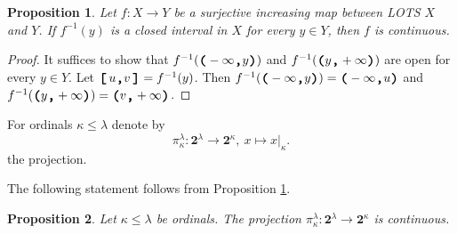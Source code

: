 \documentclass[preprint]{elsarticle}
\def\la{\lambda}
\def\ka{\kappa}
\newcommand\restrB[2]{\ensuremath{\left.#1\right|_{#2}}}
\def\restr#1#2{\restrB{#1}{#2}}
\newtheorem{proposition}{Proposition}[section]
\theoremstyle{definition}
\theoremstyle{remark}
\def\lex#1#2{\mathfrak{L}(#2^{#1})}
\def\lex#1#2{#2^{#1}}
\def\lL(#1,#2){(-\infty,#1)}
\def\lR(#1,#2){(#1,+\infty)}
\def\B{2}
\def\B{\mathsf{2}}
\def\B{\mathbf{2}}
\def\ilcomma/{\boldsymbol{,}}
\def\ilsymlp{\boldsymbol{(}}
\def\ilsymrp{\boldsymbol{)}}
\def\ilsymlc{\boldsymbol{[}}
\def\ilsymrc{\boldsymbol{]}}
\def\ilfont#1{\boldsymbol{#1}}
\def\ilfontX#1{\mathrm{\text{\texttt{\textbf{\large #1}}}}}
\def\ilfontX#1{{\text{\texttt{\textbf{\large \upshape #1}}}}}
\def\ilfont#1{\raisebox{-1.2pt}{\ilfontX{#1}}}
\def\ilfontC#1{\raisebox{-0.7pt}{\ilfontX{#1}}}
\def\ilcomma/{\ilfontC{,}}
\def\ilsymlp{\ilfont{(}}
\def\ilsymrp{\ilfont{)}}
\def\ilsymlc{\ilfont{[}\,}
\def\ilsymrc{\,\ilfont{]}}
\def\ilpp(#1,#2){\ilsymlp#1\ilcomma/ #2\ilsymrp}
\def\ilcc[#1,#2]{\ilsymlc#1\ilcomma/ #2\ilsymrc}
\def\lL(#1,#2){\ilpp(-\infty, #1)}
\def\lR(#1,#2){\ilpp(#1, +\infty)}
\def\lexab{\lex\la\B}
\begin{document}
\begin{proposition}\label{p:blex:2-1}
Let $f: X\to Y$ be a surjective increasing map between LOTS $X$ and $Y$.
If $f^{-1}(y)$ is a closed interval in $X$ for every $y\in Y$, then $f$ is continuous.
\end{proposition}
\begin{proof}
It suffices to show that $f^{-1}(\lL(y,-\infty))$ and $f^{-1}(\lR(y,+\infty))$ are open for every $y\in Y$.
Let $\ilcc[u,v]=f^{-1}(y)$. Then $f^{-1}(\lL(y,-\infty))=\lL(u,-\infty)$ and $f^{-1}(\lR(y,-\infty))=\lR(v,+\infty)$.
\end{proof}

For ordinals $\ka\leq \la$ denote by
\[
\pi_\ka^\la: \lexab \to \B^\ka,\ x\mapsto \restr x\ka.
\]
the projection.

The following statement follows from Proposition \ref{p:blex:2-1}.

\begin{proposition}\label{p:blex:2}
Let $\ka\leq \la$ be ordinals. The projection $\pi^\la_\ka: \lexab \to \B^\ka$ is continuous.
\end{proposition}
\end{document}
